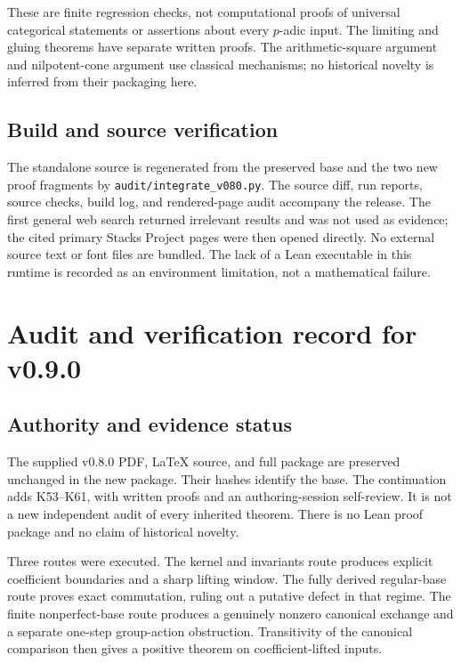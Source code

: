 \documentclass[11pt]{article}
\theoremstyle{definition}
\theoremstyle{remark}
\begin{document}
These are finite regression checks, not computational proofs of universal categorical statements or assertions about every $p$-adic input. The limiting and gluing theorems have separate written proofs. The arithmetic-square argument and nilpotent-cone argument use classical mechanisms; no historical novelty is inferred from their packaging here.

\subsection{Build and source verification}
The standalone source is regenerated from the preserved base and the two new proof fragments by \texttt{audit/integrate\_v080.py}. The source diff, run reports, source checks, build log, and rendered-page audit accompany the release. The first general web search returned irrelevant results and was not used as evidence; the cited primary Stacks Project pages were then opened directly. No external source text or font files are bundled. The lack of a Lean executable in this runtime is recorded as an environment limitation, not a mathematical failure.

\clearpage
\section{Audit and verification record for v0.9.0}\label{app:audit-v090}

\subsection{Authority and evidence status}
The supplied v0.8.0 PDF, LaTeX source, and full package are preserved unchanged in the new package. Their hashes identify the base. The continuation adds K53--K61, with written proofs and an authoring-session self-review. It is not a new independent audit of every inherited theorem. There is no Lean proof package and no claim of historical novelty.

Three routes were executed. The kernel and invariants route produces explicit coefficient boundaries and a sharp lifting window. The fully derived regular-base route proves exact commutation, ruling out a putative defect in that regime. The finite nonperfect-base route produces a genuinely nonzero canonical exchange and a separate one-step group-action obstruction. Transitivity of the canonical comparison then gives a positive theorem on coefficient-lifted inputs.
\end{document}
